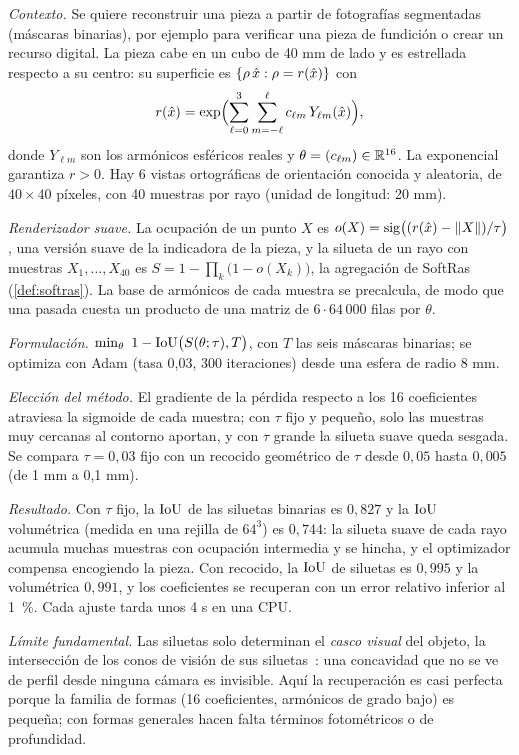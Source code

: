 \begin{ejemplo}\label{ej:siluetas}
\emph{Contexto.} Se quiere reconstruir una pieza a partir de fotografías segmentadas (máscaras binarias), por ejemplo para verificar una pieza de fundición o crear un recurso digital. La pieza cabe en un cubo de 40 mm de lado y es estrellada respecto a su centro: su superficie es $\{\rho\,\hat{x}:\rho=r(\hat{x})\}$ con
\[
r(\hat{x})=\exp\Bigl(\sum_{\ell=0}^{3}\sum_{m=-\ell}^{\ell}c_{\ell m}\,Y_{\ell m}(\hat{x})\Bigr),
\]
donde $Y_{\ell m}$ son los armónicos esféricos reales y $\theta=(c_{\ell m})\in\mathbb{R}^{16}$. La exponencial garantiza $r>0$. Hay 6 vistas ortográficas de orientación conocida y aleatoria, de $40\times 40$ píxeles, con 40 muestras por rayo (unidad de longitud: 20 mm).

\emph{Renderizador suave.} La ocupación de un punto $X$ es $o(X)=\operatorname{sig}\bigl((r(\hat{x})-\lVert X\rVert)/\tau\bigr)$, una versión suave de la indicadora de la pieza, y la silueta de un rayo con muestras $X_1,\dots,X_{40}$ es $S=1-\prod_k\bigl(1-o(X_k)\bigr)$, la agregación de SoftRas (\cref{def:softras}). La base de armónicos de cada muestra se precalcula, de modo que una pasada cuesta un producto de una matriz de $6\cdot 64\,000$ filas por $\theta$.

\emph{Formulación.} $\min_\theta\ 1-\IoU\bigl(S(\theta;\tau),T\bigr)$, con $T$ las seis máscaras binarias; se optimiza con Adam (tasa 0,03, 300 iteraciones) desde una esfera de radio 8 mm.

\emph{Elección del método.} El gradiente de la pérdida respecto a los 16 coeficientes atraviesa la sigmoide de cada muestra; con $\tau$ fijo y pequeño, solo las muestras muy cercanas al contorno aportan, y con $\tau$ grande la silueta suave queda sesgada. Se compara $\tau=0{,}03$ fijo con un recocido geométrico de $\tau$ desde $0{,}05$ hasta $0{,}005$ (de 1 mm a 0,1 mm).

\emph{Resultado.} Con $\tau$ fijo, la $\operatorname{IoU}$ de las siluetas binarias es $0{,}827$ y la $\operatorname{IoU}$ volumétrica (medida en una rejilla de $64^3$) es $0{,}744$: la silueta suave de cada rayo acumula muchas muestras con ocupación intermedia y se hincha, y el optimizador compensa encogiendo la pieza. Con recocido, la $\operatorname{IoU}$ de siluetas es $0{,}995$ y la volumétrica $0{,}991$, y los coeficientes se recuperan con un error relativo inferior al 1~\%. Cada ajuste tarda unos 4 s en una CPU.

\emph{Límite fundamental.} Las siluetas solo determinan el \emph{casco visual} del objeto, la intersección de los conos de visión de sus siluetas~\cite{laurentini}: una concavidad que no se ve de perfil desde ninguna cámara es invisible. Aquí la recuperación es casi perfecta porque la familia de formas (16 coeficientes, armónicos de grado bajo) es pequeña; con formas generales hacen falta términos fotométricos o de profundidad.
\end{ejemplo}

